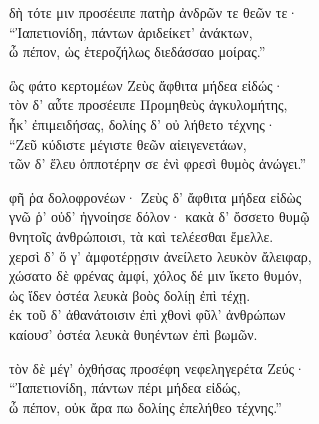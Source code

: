 \quad{}δὴ τότε μιν προσέειπε πατὴρ ἀνδρῶν τε θεῶν τε· \\
``Ἰαπετιονίδη, πάντων ἀριδείκετ' ἀνάκτων, \\
ὦ πέπον, ὡς ἑτεροζήλως διεδάσσαο μοίρας.'' 

\quad{}ὣς φάτο κερτομέων Ζεὺς ἄφθιτα μήδεα εἰδώς·  \\
τὸν δ' αὖτε προσέειπε Προμηθεὺς ἀγκυλομήτης,\\
ἦκ' ἐπιμειδήσας, δολίης δ' οὐ λήθετο τέχνης· \\
``Ζεῦ κύδιστε μέγιστε θεῶν αἰειγενετάων, \\
τῶν δ' ἕλευ ὁπποτέρην σε ἐνὶ φρεσὶ θυμὸς ἀνώγει.'' 

\quad{}φῆ ῥα δολοφρονέων· Ζεὺς δ' ἄφθιτα μήδεα εἰδὼς  \\
γνῶ ῥ' οὐδ' ἠγνοίησε δόλον· κακὰ δ' ὄσσετο θυμῷ \\
θνητοῖς ἀνθρώποισι, τὰ καὶ τελέεσθαι ἔμελλε.\\
χερσὶ δ' ὅ γ' ἀμφοτέρῃσιν ἀνείλετο λευκὸν ἄλειφαρ, \\
χώσατο δὲ φρένας ἀμφί, χόλος δέ μιν ἵκετο θυμόν,\\
ὡς ἴδεν ὀστέα λευκὰ βοὸς δολίῃ ἐπὶ τέχῃ. \\
ἐκ τοῦ δ' ἀθανάτοισιν ἐπὶ χθονὶ φῦλ' ἀνθρώπων\\
καίουσ' ὀστέα λευκὰ θυηέντων ἐπὶ βωμῶν. 

\quad{}τὸν δὲ μέγ' ὀχθήσας προσέφη νεφεληγερέτα Ζεύς· \\
``Ἰαπετιονίδη, πάντων πέρι μήδεα εἰδώς, \\
ὦ πέπον, οὐκ ἄρα πω δολίης ἐπελήθεο τέχνης.''  

